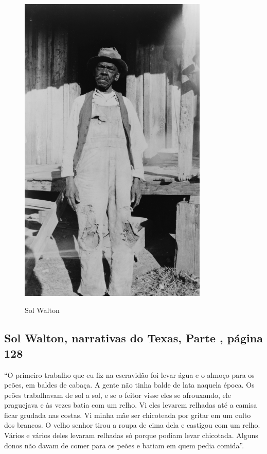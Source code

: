 \pagebreak
\thispagestyle{empty}
\begin{figure}[!ht]
\centering
 \includegraphics[width=90mm]{./imgs/solwaltson_recorte.jpg} \label{img3}
\caption{Sol Walton}
\end{figure}

\subsection{Sol Walton, narrativas do Texas, Parte , página 128}
\label{ref275}

``O primeiro trabalho que eu fiz na escravidão foi levar água e o almoço
para os peões, em baldes de cabaça. A gente não tinha balde de lata
naquela época. Os peões trabalhavam de sol a sol, e se o feitor visse
eles se afrouxando, ele praguejava e às vezes batia com um relho. Vi
eles levarem relhadas até a camisa ficar grudada nas costas. Vi minha
mãe ser chicoteada por gritar em um culto dos brancos. O velho senhor
tirou a roupa de cima dela e castigou com um relho. Vários e vários
deles levaram relhadas só porque podiam levar chicotada. Alguns donos
não davam de comer para os peões e batiam em quem pedia comida''.

